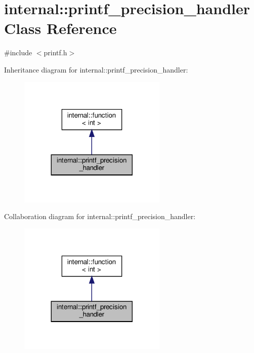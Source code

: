 \hypertarget{classinternal_1_1printf__precision__handler}{}\section{internal\+:\+:printf\+\_\+precision\+\_\+handler Class Reference}
\label{classinternal_1_1printf__precision__handler}


{\ttfamily \#include $<$printf.\+h$>$}



Inheritance diagram for internal\+:\+:printf\+\_\+precision\+\_\+handler\+:
\nopagebreak
\begin{figure}[H]
\begin{center}
\leavevmode
\includegraphics[width=200pt]{classinternal_1_1printf__precision__handler__inherit__graph}
\end{center}
\end{figure}


Collaboration diagram for internal\+:\+:printf\+\_\+precision\+\_\+handler\+:
\nopagebreak
\begin{figure}[H]
\begin{center}
\leavevmode
\includegraphics[width=200pt]{classinternal_1_1printf__precision__handler__coll__graph}
\end{center}
\end{figure}
